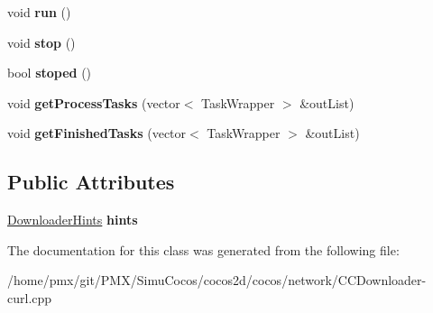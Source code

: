 \begin{DoxyCompactItemize}
\item 
\mbox{\label{classcocos2d_1_1network_1_1DownloaderCURL_1_1Impl_a96828122e9c3fde4fc8327ee134901aa}} 
void {\bfseries run} ()
\item 
\mbox{\label{classcocos2d_1_1network_1_1DownloaderCURL_1_1Impl_abacb6d16beea9d1fa4f612c56c7dea0a}} 
void {\bfseries stop} ()
\item 
\mbox{\label{classcocos2d_1_1network_1_1DownloaderCURL_1_1Impl_a1f5b566200c0020cb23b2661d1cec3b3}} 
bool {\bfseries stoped} ()
\item 
\mbox{\label{classcocos2d_1_1network_1_1DownloaderCURL_1_1Impl_a3d5482c0c85ac4a380309bbf31428b59}} 
void {\bfseries get\+Process\+Tasks} (vector$<$ Task\+Wrapper $>$ \&out\+List)
\item 
\mbox{\label{classcocos2d_1_1network_1_1DownloaderCURL_1_1Impl_a5516d1c5320815d1d9118910a66480d2}} 
void {\bfseries get\+Finished\+Tasks} (vector$<$ Task\+Wrapper $>$ \&out\+List)
\end{DoxyCompactItemize}
\subsection*{Public Attributes}
\begin{DoxyCompactItemize}
\item 
\mbox{\label{classcocos2d_1_1network_1_1DownloaderCURL_1_1Impl_a0c7cc833a63c3b5cb85faf1378688a4b}} 
\hyperlink{classcocos2d_1_1network_1_1DownloaderHints}{Downloader\+Hints} {\bfseries hints}
\end{DoxyCompactItemize}


The documentation for this class was generated from the following file\+:\begin{DoxyCompactItemize}
\item 
/home/pmx/git/\+P\+M\+X/\+Simu\+Cocos/cocos2d/cocos/network/C\+C\+Downloader-\/curl.\+cpp\end{DoxyCompactItemize}
